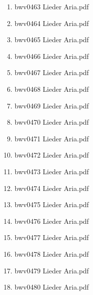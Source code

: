\documentclass[11pt]{article}
\begin{document}
\begin{enumerate}
\begin{enumerate}
\begin{enumerate}
\item bwv0463   Lieder Aria.pdf
\label{sec-1-1-1-1-44-6-7-4-25}

\item bwv0464   Lieder Aria.pdf
\label{sec-1-1-1-1-44-6-7-4-26}

\item bwv0465   Lieder Aria.pdf
\label{sec-1-1-1-1-44-6-7-4-27}

\item bwv0466   Lieder Aria.pdf
\label{sec-1-1-1-1-44-6-7-4-28}

\item bwv0467   Lieder Aria.pdf
\label{sec-1-1-1-1-44-6-7-4-29}

\item bwv0468   Lieder Aria.pdf
\label{sec-1-1-1-1-44-6-7-4-30}

\item bwv0469   Lieder Aria.pdf
\label{sec-1-1-1-1-44-6-7-4-31}

\item bwv0470   Lieder Aria.pdf
\label{sec-1-1-1-1-44-6-7-4-32}

\item bwv0471   Lieder Aria.pdf
\label{sec-1-1-1-1-44-6-7-4-33}

\item bwv0472   Lieder Aria.pdf
\label{sec-1-1-1-1-44-6-7-4-34}

\item bwv0473   Lieder Aria.pdf
\label{sec-1-1-1-1-44-6-7-4-35}

\item bwv0474   Lieder Aria.pdf
\label{sec-1-1-1-1-44-6-7-4-36}

\item bwv0475   Lieder Aria.pdf
\label{sec-1-1-1-1-44-6-7-4-37}

\item bwv0476   Lieder Aria.pdf
\label{sec-1-1-1-1-44-6-7-4-38}

\item bwv0477   Lieder Aria.pdf
\label{sec-1-1-1-1-44-6-7-4-39}

\item bwv0478   Lieder Aria.pdf
\label{sec-1-1-1-1-44-6-7-4-40}

\item bwv0479   Lieder Aria.pdf
\label{sec-1-1-1-1-44-6-7-4-41}

\item bwv0480   Lieder Aria.pdf
\label{sec-1-1-1-1-44-6-7-4-42}


\end{enumerate}
\end{enumerate}
\end{enumerate}
\end{document}
